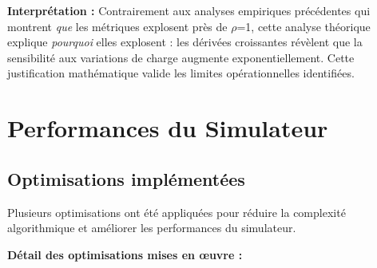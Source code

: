 \documentclass[12pt,a4paper]{article}
\newcommand{\ro}{\rho}
\begin{document}
\vspace{0.3cm}
\textbf{Interprétation :} Contrairement aux analyses empiriques précédentes qui montrent \textit{que} les métriques explosent près de $\ro$=1, cette analyse théorique explique \textit{pourquoi} elles explosent : les dérivées croissantes révèlent que la sensibilité aux variations de charge augmente exponentiellement. Cette justification mathématique valide les limites opérationnelles identifiées.

\vspace{0.5cm}
\section{Performances du Simulateur}\label{sec:performances}

\subsection{Optimisations implémentées}

Plusieurs optimisations ont été appliquées pour réduire la complexité algorithmique et améliorer les performances du simulateur.

\noindent\textbf{Détail des optimisations mises en œuvre :}
\end{document}

